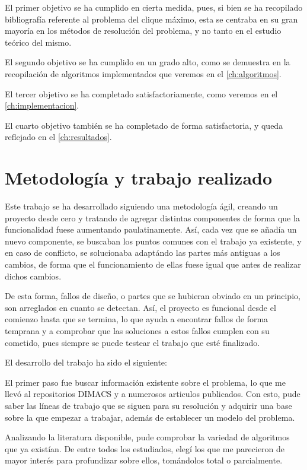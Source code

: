 El primer objetivo se ha cumplido en cierta medida, pues, si bien se ha recopilado
bibliografía referente al problema del clique máximo, esta se centraba en su gran
mayoría en los métodos de resolución del problema, y no tanto en el estudio teórico
del mismo.

El segundo objetivo se ha cumplido en un grado alto, como se demuestra en la recopilación
de algoritmos implementados que veremos en el \autoref{ch:algoritmos}.

El tercer objetivo se ha completado satisfactoriamente, como veremos en el \autoref{ch:implementacion}.

El cuarto objetivo también se ha completado de forma satisfactoria, y queda
reflejado en el \autoref{ch:resultados}.

\section{Metodología y trabajo realizado}

Este trabajo se ha desarrollado siguiendo una metodología ágil, creando un proyecto
desde cero y tratando de agregar distintas componentes de forma que la funcionalidad
fuese aumentando paulatinamente. Así, cada vez que se añadía un nuevo componente,
se buscaban los puntos comunes con el trabajo ya existente, y en caso de conflicto,
se solucionaba adaptándo las partes más antiguas a los cambios, de forma que el
funcionamiento de ellas fuese igual que antes de realizar dichos cambios.

De esta forma, fallos de diseño, o partes que se hubieran obviado en un principio,
son arreglados en cuanto se detectan. Así, el proyecto es funcional desde el comienzo
hasta que se termina, lo que ayuda a encontrar fallos de forma temprana y a comprobar
que las soluciones a estos fallos cumplen con su cometido, pues siempre se puede
testear el trabajo que esté finalizado.

El desarrollo del trabajo ha sido el siguiente:  

El primer paso fue buscar información existente sobre el problema, lo que me llevó
al repositorios DIMACS y a numerosos articulos publicados. Con esto, pude saber
las líneas de trabajo que se siguen para su resolución y adquirir una base sobre
la que empezar a trabajar, además de establecer un modelo del problema.

Analizando la literatura disponible, pude comprobar la variedad de algoritmos
que ya existían. De entre todos los estudiados, elegí los que me parecieron de
mayor interés para profundizar sobre ellos, tomándolos total o parcialmente.

